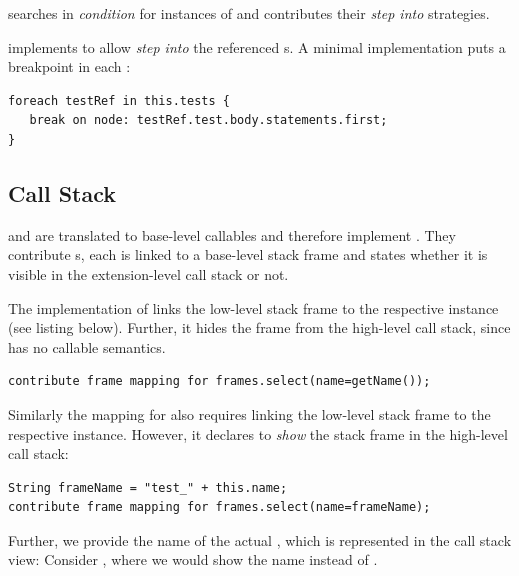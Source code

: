  searches in \emph{condition}
for instances of  and contributes their 
\emph{step into} strategies.

 implements  to allow 
\emph{step into} the referenced s. A  
minimal implementation puts a breakpoint in each :
\begin{lstlisting}[language=debuggerDSL,frame=single]
foreach testRef in this.tests { 
   break on node: testRef.test.body.statements.first;
}
\end{lstlisting}

\subsection{Call Stack}
\label{CallStackDebuggerDef}

 and  are translated to 
base-level callables and therefore implement
. They contribute s, 
each is linked to a base-level stack frame and
states whether it is visible in the extension-level call stack or not.

The implementation of   links the
low-level stack frame to the respective instance (see listing below).
Further, it hides the frame from the high-level call stack, since
 has no callable semantics.

\begin{lstlisting}[language=debuggerDSL,frame=single]
contribute frame mapping for frames.select(name=getName());
\end{lstlisting}

Similarly the mapping for  also requires linking the
low-level stack frame to the respective instance. However, 
it declares to \emph{show} the stack frame in the high-level call stack:
\begin{lstlisting}[language=debuggerDSL,frame=single]
String frameName = "test_" + this.name;
contribute frame mapping for frames.select(name=frameName);
\end{lstlisting}
Further, we provide the name of the actual , which is represented
in the call stack view: Consider , where we would
show the name  instead of .